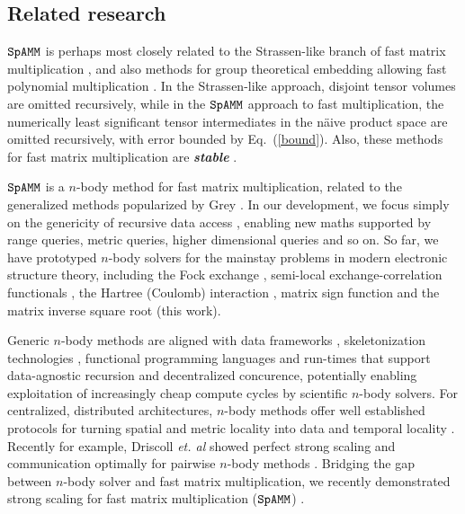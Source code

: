 \documentclass[letterpaper,twocolumn,amsmath,amsfont,amssymb,english,aps,jcp,preprintnumbers,groupaddress,nofootinbib,tightenlines,floatfix]{revtex4}
\theoremstyle{plain}
\theoremstyle{remark}
\theoremstyle{plain}
\begin{document}
\subsection{Related research}\label{relatedr} 

$\tt SpAMM$ is perhaps most closely related to the Strassen-like branch of fast matrix multiplication 
\cite{springerlink:10.1007/BF02165411,DDH07,Ballard2014,LeGall:2014:PTF:2608628.2608664,Ambainis15},
and also methods for group theoretical embedding allowing fast polynomial multiplication 
\cite{cohn2003group,cohn2005group,Umans:2006:GAM:1145768.1145772}.
In the Strassen-like approach, disjoint tensor volumes are omitted recursively, 
while in the $\tt SpAMM$ approach to fast multiplication, the numerically least significant 
tensor intermediates in the n\"{a}ive product space are omitted recursively, with error bounded by Eq.~(\ref{bound}).  
Also, these methods for fast matrix multiplication are {\bf \em stable} \cite{DDH07}.

$\tt SpAMM$ is a $n$-body method for fast matrix multiplication, related to the 
generalized methods popularized by Grey \cite{Gray01,Gray2003}. In our development,
we focus simply on the genericity of recursive data access 
\cite{genericityindata,Geerts2002,Samet:2006:DBDS,Gottschling2009},
enabling new maths supported by range queries, metric queries, higher dimensional queries and so on.
So far, we have prototyped $n$-body solvers for the  mainstay problems in modern electronic structure theory, 
including the Fock exchange \cite{challacombe2014n}, 
semi-local exchange-correlation functionals \cite{Challacombe:2000:HiCu,10.1063/1.1568734}, 
the Hartree (Coulomb) interaction \cite{Challacombe:Review,Challacombe:1996:QCTCb,Challacombe:1997:QCTC,Challacombe:1997:PFMM}, 
matrix sign function \cite{Challacombe2010,BockCK14} 
and the matrix inverse square root (this work).

Generic $n$-body methods are aligned with data frameworks \cite{},  
skeletonization technologies \cite{Sarje2010a,Gonzalez-Velez:2010:SAS:1890754.1890757,CPE:CPE3087,rodrigues2014triolet,March}, 
functional programming languages \cite{} and run-times \cite{} that support data-agnostic recursion and decentralized concurence, 
potentially enabling exploitation of increasingly cheap compute cycles by scientific $n$-body solvers. 
For centralized, distributed architectures, $n$-body methods offer well established protocols 
for turning spatial and metric locality into 
data and temporal locality \cite{Warren:1993:PHO:169627.169640,Warren:1995:HOT,Warren1995266,WarrenGordonBell1997,Warren2013}.  
Recently for example, Driscoll {\em et. al} showed perfect strong scaling and communication optimally 
for pairwise $n$-body methods \cite{Driscoll2013}.   Bridging the gap between 
$n$-body solver and fast matrix multiplication, we recently demonstrated strong scaling for fast matrix multiplication 
($\tt SpAMM$) \cite{BockCK14}.  
\end{document}
